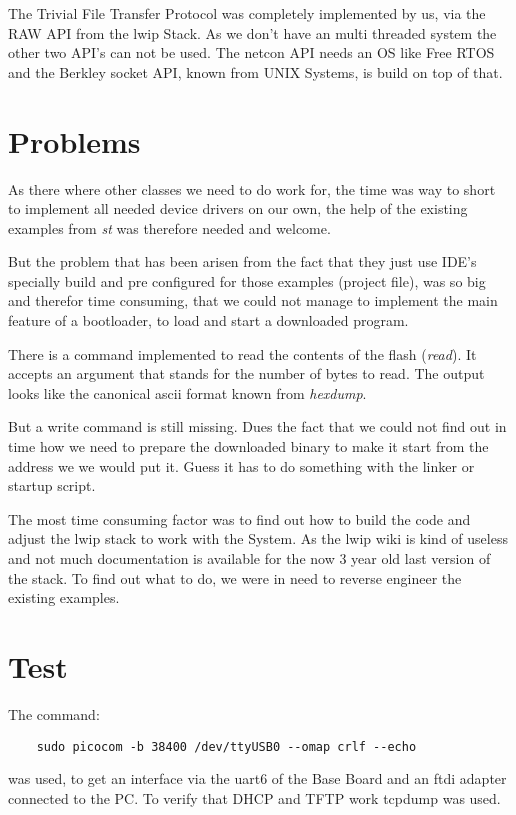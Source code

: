 The Trivial File Transfer Protocol \citep{tftp} was completely implemented by us,
via the RAW API from the lwip Stack.
As we don't have an multi threaded system the other two API's can not be used.
The netcon API needs an OS like Free RTOS and the Berkley socket API,
known from UNIX Systems, is build on top of that.

\section{Problems}
As there where other classes we need to do work for, the time was way to short
to implement all needed device drivers on our own, the help of the existing examples from
\textit{st} \citep{st-BB-examples} was therefore needed and welcome.

But the problem that has been arisen from the fact that they just use IDE's
specially build and pre configured for those examples (project file),
was so big and therefor time consuming,
that we could not manage to implement the main feature of a bootloader,
to load and start a downloaded program.

There is a command implemented to read the contents of the flash (\textit{read}).
It accepts an argument that stands for the number of bytes to read.
The output looks like the canonical ascii format known from \textit{hexdump}.

But a write command is still missing. Dues the fact that we could not find out in time
how we need to prepare the downloaded binary to make it start from the address we we would put it.
Guess it has to do something with the linker or startup script.

The most time consuming factor was to find out how to build the code and adjust the lwip stack
to work with the System. As the lwip wiki is kind of useless and not much documentation is available
for the now 3 year old last version of the stack.
To find out what to do, we were in need to reverse engineer the existing examples.

\section{Test}
The command:
\begin{verbatim}
	sudo picocom -b 38400 /dev/ttyUSB0 --omap crlf --echo
\end{verbatim}
was used, to get an interface via the uart6 of the Base Board and an ftdi adapter connected to the PC.
To verify that DHCP and TFTP work tcpdump was used.

